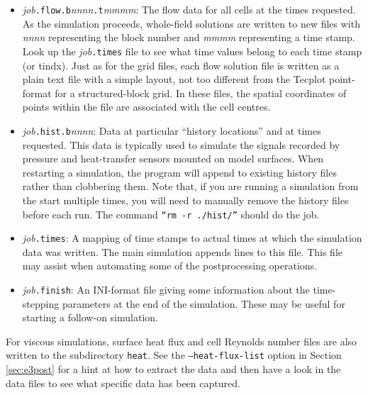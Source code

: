          \begin{itemize}
           \item \textit{job}\texttt{.flow.b}\textit{nnnn}\texttt{.t}\textit{mmmm}:
             The flow data for all cells at the times requested.
             As the simulation proceeds, whole-field solutions are written
             to new files with \textit{nnnn} representing the block number and
             \textit{mmmm} representing a time stamp.
             Look up the \textit{job}\texttt{.times} file to see what time values
             belong to each time stamp (or tindx).
             Just as for the grid files, each flow solution file is written 
             as a plain text file with a simple layout, not too different from 
             the Tecplot point-format for a structured-block grid.
             In these files, the spatial coordinates of points within the file are
             associated with the cell centres.
           \item  \textit{job}\texttt{.hist.b}\textit{nnnn}: 
             Data at particular ``history locations'' and at times requested.
             This data is typically used to simulate the signals recorded by pressure 
             and heat-transfer sensors mounted on model surfaces.
             When restarting a simulation, the program will append to existing history files 
             rather than clobbering them.
             Note that, if you are running a simulation from the start multiple times, 
             you will need to manually remove the history files before each run.  
             The command \texttt{``rm -r ./hist/''} should do the job.
           \item  \textit{job}\texttt{.times}: 
             A mapping of time stamps to actual times at which the simulation
             data was written.
             The main simulation appends lines to this file.
             This file may assist when automating some of the postprocessing operations.
           \item  \textit{job}\texttt{.finish}: 
             An INI-format file giving some information about the time-stepping parameters
             at the end of the simulation.
             These may be useful for starting a follow-on simulation.
         \end{itemize}

\medskip
For viscous simulations, surface heat flux and cell Reynolds number files are also written to the subdirectory \texttt{heat}.
See the \texttt{--heat-flux-list} option in Section\,\ref{sec:e3post} for a hint at how to extract the data and then
have a look in the data files to see what specific data has been captured. 

